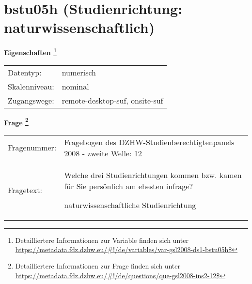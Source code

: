 
    \setcounter{footnote}{0}

    \vspace*{-1.8cm}
	\section{bstu05h (Studienrichtung: naturwissenschaftlich)}
	\label{section:bstu05h}



    \vspace*{0.5cm}
    \noindent\textbf{Eigenschaften
	\footnote{Detailliertere Informationen zur Variable finden sich unter
		\url{https://metadata.fdz.dzhw.eu/\#!/de/variables/var-gsl2008-ds1-bstu05h$}}}\\
	\begin{tabularx}{\hsize}{@{}lX}
	Datentyp: & numerisch \\
	Skalenniveau: & nominal \\
	Zugangswege: &
	  remote-desktop-suf, 
	  onsite-suf
 \\
    \end{tabularx}



				\vspace*{0.5cm}
                \noindent\textbf{Frage
	                \footnote{Detailliertere Informationen zur Frage finden sich unter
		              \url{https://metadata.fdz.dzhw.eu/\#!/de/questions/que-gsl2008-ins2-12$}}}\\
				\begin{tabularx}{\hsize}{@{}lX}
					Fragenummer: &
					  Fragebogen des DZHW-Studienberechtigtenpanels 2008 - zweite Welle:
					  12
 \\
					Fragetext: & Welche drei Studienrichtungen kommen bzw. kamen für Sie persönlich am ehesten infrage?\par  naturwissenschaftliche Studienrichtung \\
				\end{tabularx}





